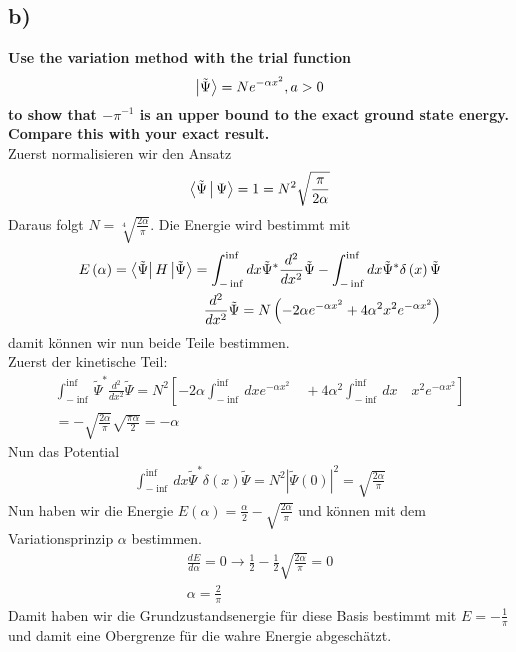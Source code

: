 
\subsection{b)}

\textbf{Use the variation method with the trial function}
\begin{equation}
\Ket{\tilde{\Psi}} = N e^{-\alpha x^{2}} , a > 0
\end{equation}
\textbf{to show that $-\pi^{-1}$ is an upper bound to the exact ground state energy.}\\
\textbf{Compare  this with your exact result.}\\

Zuerst normalisieren wir den Ansatz
\begin{align}
\Braket{\tilde{\Psi} | \Psi} = 1 = N^2 \sqrt{\frac{\pi}{2\alpha}}
\end{align}
Daraus folgt $N = \sqrt[4]{\frac{2\alpha}{\pi}}$. Die Energie wird bestimmt mit
\begin{align}
E \left(\alpha\right) = \Bra{\tilde{\Psi}} H \Ket{\tilde{\Psi}} = \int_{-\inf}^{\inf} dx \tilde{\Psi}^* \frac{d^2}{dx^2} \tilde{\Psi} - \int_{-\inf}^{\inf} dx \tilde{\Psi}^* \delta \left( x \right) \tilde{\Psi} \\
\frac{d^2}{dx^2} \tilde{\Psi} = N \left( -2\alpha e^{-\alpha x^{2}} + 4 \alpha^2 x^2 e^{-\alpha x^{2}} \right)
\end{align}
damit k\"onnen wir nun beide Teile bestimmen.\\
Zuerst der kinetische Teil:
\begin{align}
\int_{-\inf}^{\inf} \tilde{\Psi}^* \frac{d^2}{dx^2} \tilde{\Psi} = N^2 \left[ - 2 \alpha \int_{-\inf}^{\inf} dx e^{-\alpha x^{2}} \quad + 4 \alpha^2 \int_{-\inf}^{\inf} dx \quad x^2 e^{-\alpha x^{2}} \right] \\
= - \sqrt{\frac{2\alpha}{\pi}} \sqrt{\frac{\pi \alpha}{2}} = -\alpha
\end{align}
Nun das Potential
\begin{align}
\int_{-\inf}^{\inf} dx \tilde{\Psi}^* \delta \left( x \right) \tilde{\Psi} = N^2 |\tilde{\Psi}\left(0\right)|^2 = \sqrt{\frac{2\alpha}{\pi}}
\end{align}
Nun haben wir die Energie $E\left(\alpha \right) = \frac{\alpha}{2} - \sqrt{\frac{2\alpha}{\pi}}$ und k\"onnen mit dem Variationsprinzip $\alpha$ bestimmen.
\begin{align}
\frac{dE}{d\alpha} = 0  \rightarrow \frac{1}{2} - \frac{1}{2} \sqrt{\frac{2\alpha}{\pi}} = 0 \\
\alpha = \frac{2}{\pi}
\end{align}
Damit haben wir die Grundzustandsenergie f\"ur diese Basis bestimmt mit $E = -\frac{1}{\pi}$ und damit eine Obergrenze f\"ur die wahre Energie abgesch\"atzt.








